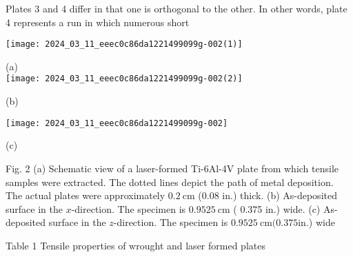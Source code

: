\documentclass[10pt]{article}
\begin{document}
Plates 3 and 4 differ in that one is orthogonal to the other. In other words, plate 4 represents a run in which numerous short

\begin{center}
\texttt{[image: 2024\_03\_11\_eeec0c86da1221499099g-002(1)]}
\end{center}

(a)\\
\texttt{[image: 2024\_03\_11\_eeec0c86da1221499099g-002(2)]}

(b)

\begin{center}
\texttt{[image: 2024\_03\_11\_eeec0c86da1221499099g-002]}
\end{center}

(c)

Fig. 2 (a) Schematic view of a laser-formed Ti-6Al-4V plate from which tensile samples were extracted. The dotted lines depict the path of metal deposition. The actual plates were approximately $0.2 \mathrm{~cm}$ (0.08 in.) thick. (b) As-deposited surface in the $x$-direction. The specimen is $0.9525 \mathrm{~cm}$ ( 0.375 in.) wide. (c) As-deposited surface in the $z$-direction. The specimen is $0.9525 \mathrm{~cm}(0.375 \mathrm{in}$.) wide

Table 1 Tensile properties of wrought and laser formed plates
\end{document}
